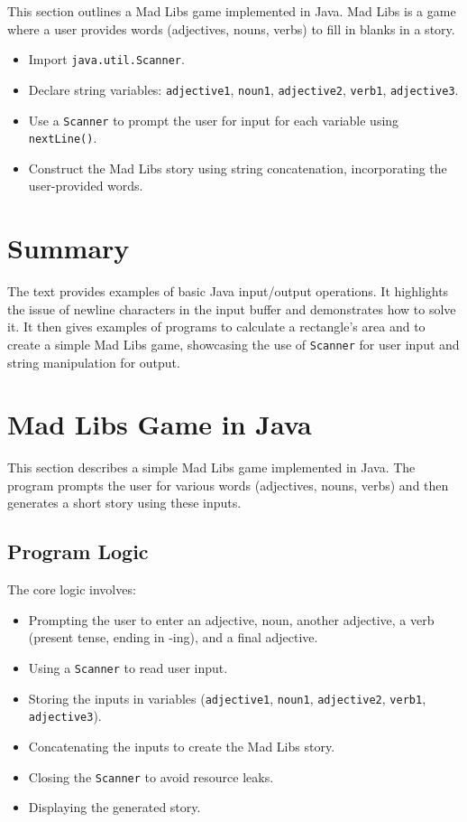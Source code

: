 \documentclass{article}
\begin{document}
This section outlines a Mad Libs game implemented in Java.  Mad Libs is a game where a user provides words (adjectives, nouns, verbs) to fill in blanks in a story.

\begin{itemize}
    \item Import \texttt{java.util.Scanner}.
    \item Declare string variables: \texttt{adjective1}, \texttt{noun1}, \texttt{adjective2}, \texttt{verb1}, \texttt{adjective3}.
    \item Use a \texttt{Scanner} to prompt the user for input for each variable using \texttt{nextLine()}.
    \item Construct the Mad Libs story using string concatenation, incorporating the user-provided words.
\end{itemize}

\section{Summary}

The text provides examples of basic Java input/output operations. It highlights the issue of newline characters in the input buffer and demonstrates how to solve it.  It then gives examples of programs to calculate a rectangle's area and to create a simple Mad Libs game, showcasing the use of \texttt{Scanner} for user input and string manipulation for output.


\section{Mad Libs Game in Java}

This section describes a simple Mad Libs game implemented in Java.  The program prompts the user for various words (adjectives, nouns, verbs) and then generates a short story using these inputs.

\subsection{Program Logic}

The core logic involves:

\begin{itemize}
    \item Prompting the user to enter an adjective, noun, another adjective, a verb (present tense, ending in -ing), and a final adjective.
    \item Using a \texttt{Scanner} to read user input.
    \item Storing the inputs in variables (\texttt{adjective1}, \texttt{noun1}, \texttt{adjective2}, \texttt{verb1}, \texttt{adjective3}).
    \item Concatenating the inputs to create the Mad Libs story.
    \item Closing the \texttt{Scanner} to avoid resource leaks.
    \item Displaying the generated story.
\end{itemize}
\end{document}
